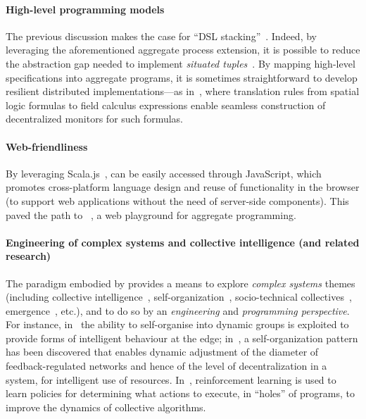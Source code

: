 \paragraph*{High-level programming models}
%
The previous discussion  
 makes the case for ``DSL stacking''~\cite{DBLP:conf/icsoft/HummE10}.
%
Indeed, by leveraging the aforementioned aggregate process extension, 
 it is possible to reduce the abstraction gap
 needed to implement \emph{situated tuples}~\cite{DBLP:conf/coordination/CasadeiVRA21}.
%
By mapping high-level specifications into aggregate programs, it is sometimes straightforward to develop resilient distributed implementations---as in~\cite{DBLP:journals/jss/AudritoCDSV21},
 where translation rules from 
 spatial logic formulas
 to field calculus expressions
 enable seamless construction of decentralized monitors for such formulas.

\paragraph*{Web-friendliness}
%
By leveraging Scala.js~\cite{DBLP:conf/scala/Doeraene18}, \scafi{} can be easily 
 accessed through JavaScript,
 which promotes cross-platform language design 
 and reuse of functionality in the browser
 (to support web applications without the need of server-side components).
%
This paved the path 
 to \scafiweb{}~\cite{DBLP:conf/coordination/AguzziCMPV21},
 a web playground for aggregate programming.
%
\paragraph*{Engineering of complex systems and collective intelligence (and related research)}
%
The paradigm embodied by \scafi{}
 provides a means 
 to explore \emph{complex systems} themes~\cite{mobus2014principles-systems-science} 
 (including collective intelligence~\cite{DBLP:journals/access/HePLMC19}, self-organization~\cite{yates2012selforg}, socio-technical collectives~\cite{miorandi2014social-collective-intelligence}, emergence~\cite{DBLP:journals/jocec/KalantariNM20}, etc.),
 and to do so by an \emph{engineering} and \emph{programming perspective}.
%
For instance, in~\cite{DBLP:journals/eaai/CasadeiVAPD21}
 the ability to self-organise into dynamic groups 
 is exploited to provide forms of intelligent behaviour at the edge;
 in~\cite{DBLP:journals/fgcs/PianiniCVN21}, 
 a self-organization pattern has been discovered
 that enables dynamic adjustment of the diameter of feedback-regulated networks and hence of the level of decentralization in a system, for intelligent use of resources.
%
In~\cite{DBLP:conf/coordination/AguzziCV22},
 reinforcement learning
 is used to learn policies
 for determining what actions to execute, in ``holes'' of \scafi{} programs,
 to improve the dynamics of collective algorithms.
%